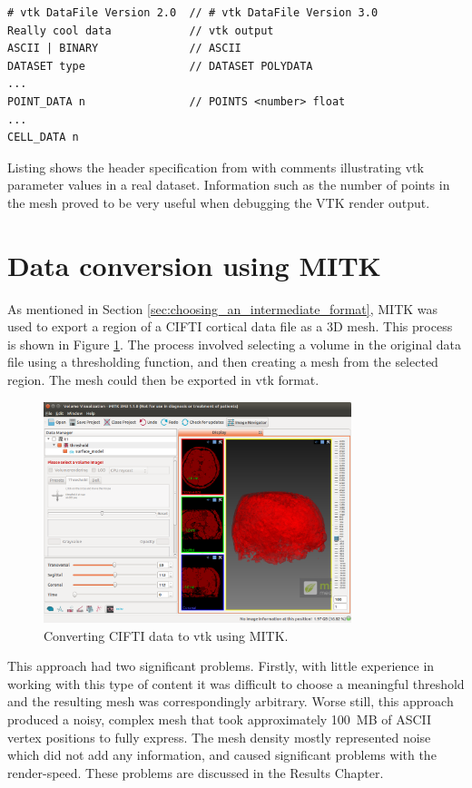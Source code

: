 \documentclass[MSc,paper=a4,pagesize=auto]{icldt}
\begin{document}
\begin{lstlisting}[label=vtk_data_structure, caption=The structure of data in a legacy .vtk file.]
# vtk DataFile Version 2.0  // # vtk DataFile Version 3.0
Really cool data            // vtk output
ASCII | BINARY              // ASCII
DATASET type                // DATASET POLYDATA
...
POINT_DATA n                // POINTS <number> float
...
CELL_DATA n
\end{lstlisting}

Listing shows the header specification from \cite{VTK_file_formats} with comments illustrating vtk parameter values in a real dataset. Information such as the number of points in the mesh proved to be very useful when debugging the VTK render output.

\section{Data conversion using MITK}
As mentioned in Section \ref{sec:choosing_an_intermediate_format}, MITK was used to export a region of a CIFTI cortical data file as a 3D mesh. This process is shown in Figure \ref{fig:MITK_conversion}. The process involved selecting a volume in the original data file using a thresholding function, and then creating a mesh from the selected region. The mesh could then be exported in vtk format.

\begin{figure}[htbp!]
    \centering
    \includegraphics[width=0.8\textwidth]{resources/MITK_conversion}
    \caption{Converting CIFTI data to vtk using MITK.}
    \label{fig:MITK_conversion}
\end{figure}

This approach had two significant problems. Firstly, with little experience in working with this type of content it was difficult to choose a meaningful threshold and the resulting mesh was correspondingly arbitrary. Worse still, this approach produced a noisy, complex mesh that took approximately \SI{100}{MB} of ASCII vertex positions to fully express. The mesh density mostly represented noise which did not add any information, and caused significant problems with the render-speed. These problems are discussed in the Results Chapter.
\end{document}
